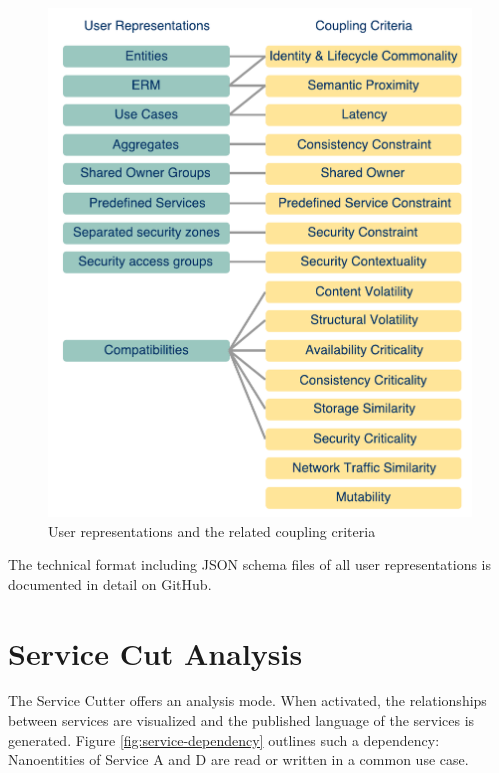 \begin{figure}[H]
	\begin{center}
		\includegraphics[scale=0.6]{diagrams/UserRep-CC.pdf}
		\caption{User representations and the related coupling criteria}
		\label{fig:userrep}
	\end{center}
\end{figure}

The technical format including \gls{JSON} schema files of all user representations is documented in detail on GitHub\cite{githubWiki}.

\section{Service Cut Analysis}

The Service Cutter offers an analysis mode. When activated, the relationships between services are visualized and the published language of the services is generated. Figure \ref{fig:service-dependency} outlines such a dependency: Nanoentities of Service A and D are read or written in a common use case. 

